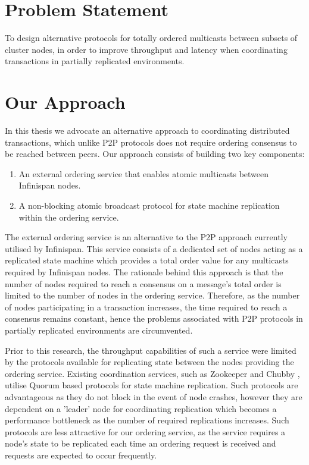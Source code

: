     \section{Problem Statement}
    To design alternative protocols for totally ordered multicasts between subsets of cluster nodes, in order to improve throughput and latency when coordinating transactions in partially replicated environments.  
    
    \section{Our Approach}    
    In this thesis we advocate an alternative approach to coordinating distributed transactions, which unlike P2P protocols does not require ordering consensus to be reached between peers.  Our approach consists of building two key components: 

	\begin{enumerate}[label=\roman*]
		\item An external ordering service that enables atomic multicasts between Infinispan nodes.
		
		\item A non-blocking atomic broadcast protocol for state machine replication within the ordering service.  
	\end{enumerate}
   
   The external ordering service is an alternative to the P2P approach currently utilised by Infinispan.  This service consists of a dedicated set of nodes acting as a replicated state machine which provides a total order value for any multicasts required by Infinispan nodes.  The rationale behind this approach is that the number of nodes required to reach a consensus on a message's total order is limited to the number of nodes in the ordering service.  Therefore, as the number of nodes participating in a transaction increases, the time required to reach a consensus remains constant, hence the problems associated with P2P protocols in partially replicated environments are circumvented.

    Prior to this research, the throughput capabilities of such a service were limited by the protocols available for replicating state between the nodes providing the ordering service.  Existing coordination services, such as Zookeeper \citep{Hunt:2010:ZWC:1855840.1855851} and Chubby \citep{Burrows:2006:CLS:1298455.1298487}, utilise Quorum based protocols for state machine replication.  Such protocols are advantageous as they do not block in the event of node crashes, however they are dependent on a 'leader' node for coordinating replication which becomes a performance bottleneck as the number of required replications increases.  Such protocols are less attractive for our ordering service, as the service requires a node's state to be replicated each time an ordering request is received and requests are expected to occur frequently.  
    
